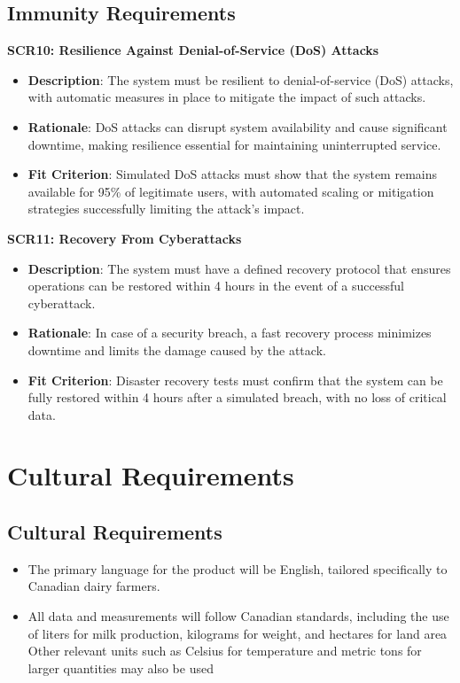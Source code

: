 \documentclass[12pt]{article}
\begin{document}
\subsection{Immunity Requirements}
\textbf{SCR10: Resilience Against Denial-of-Service (DoS) Attacks}
\begin{itemize}
    \item \textbf{Description}: The system must be resilient to 
    denial-of-service (DoS) attacks, with automatic measures in place to 
    mitigate the impact of such attacks.
    \item \textbf{Rationale}: DoS attacks can disrupt system availability and
    cause significant downtime, making resilience essential for maintaining
    uninterrupted service.
    \item \textbf{Fit Criterion}: Simulated DoS attacks must show that the
    system remains available for 95\% of legitimate users, with automated
    scaling or mitigation strategies successfully limiting the attack's impact.
\end{itemize}
\textbf{SCR11: Recovery From Cyberattacks}
\begin{itemize}
    \item \textbf{Description}: The system must have a defined recovery protocol
    that ensures operations can be restored within 4 hours in the event of a
    successful cyberattack.
    \item \textbf{Rationale}: In case of a security breach, a fast recovery
    process minimizes downtime and limits the damage caused by the attack.
    \item \textbf{Fit Criterion}: Disaster recovery tests must confirm that the
    system can be fully restored within 4 hours after a simulated breach, with
    no loss of critical data.
\end{itemize}


\section{Cultural Requirements}
\subsection{Cultural Requirements}
\begin{itemize}
	\item The primary language for the product will be English, tailored
	      specifically to Canadian dairy farmers. 
	\item All data and measurements will follow Canadian standards, including 
    the use of liters for milk production, kilograms for weight, and hectares
	for land area Other relevant units such as Celsius for temperature and
	metric tons for larger quantities may also be used
\end{itemize}
\end{document}
